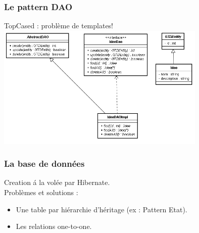 \begin{frame}
\frametitle{Le pattern DAO}
TopCased : probl\`eme de templates!
\includegraphics[width=10cm]{images/PatternDAOReel}
\end{frame}

\begin{frame}
\frametitle{La base de donn\'ees}
Creation \'a la vol\'ee par Hibernate.\\
Probl\`emes et solutions :
\begin{itemize} 
\item Une table par hi\'erarchie d'h\'eritage (ex : Pattern Etat).
\item Les relations one-to-one.
\end{itemize}
\end{frame}